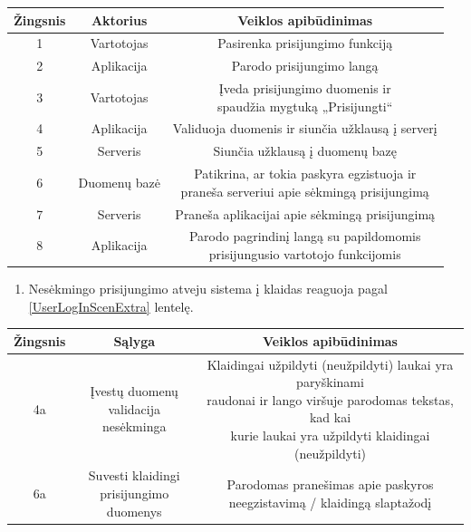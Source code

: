 \documentclass[12pt]{article}
\begin{document}
		\begin{center}
		\begin{tabular}{ | c | c | c | }
			\hline
			Žingsnis & Aktorius     & Veiklos apibūdinimas \\ \hline
			1        & Vartotojas   & Pasirenka prisijungimo funkciją \\ \hline
			2        & Aplikacija   & Parodo prisijungimo langą \\ \hline
			3        & Vartotojas   & \makecell{Įveda prisijungimo duomenis ir \\ spaudžia mygtuką „Prisijungti“} \\ \hline
			4        & Aplikacija   & Validuoja duomenis ir siunčia užklausą į serverį \\ \hline
			5        & Serveris     & Siunčia užklausą į duomenų bazę \\ \hline
			6        & Duomenų bazė & \makecell{Patikrina, ar tokia paskyra egzistuoja ir \\ praneša serveriui apie sėkmingą prisijungimą} \\ \hline
			7        & Serveris     & Praneša aplikacijai apie sėkmingą prisijungimą \\ \hline
			8        & Aplikacija   & \makecell{Parodo pagrindinį langą su papildomomis \\ prisijungusio vartotojo funkcijomis} \\ \hline
		\end{tabular}
		\bigskip
		\end{center}
		
	\begin{enumerate}[resume, labelindent=10pt,leftmargin=2.2cm]
		\item Nesėkmingo prisijungimo atveju sistema į klaidas reaguoja pagal \ref{UserLogInScenExtra} lentelę.
	\end{enumerate}		
		
		\begin{center}
		\begin{tabular}{ | c | c | c | }
			\hline
			Žingsnis & Sąlyga & Veiklos apibūdinimas \\ \hline
			4a       & \makecell{Įvestų duomenų \\ validacija nesėkminga} & \makecell{Klaidingai užpildyti (neužpildyti) laukai yra paryškinami \\ raudonai ir lango viršuje parodomas tekstas, kad kai \\ kurie laukai yra užpildyti klaidingai (neužpildyti)} \\ \hline
			6a       & \makecell{Suvesti klaidingi \\ prisijungimo duomenys} & \makecell{Parodomas pranešimas apie paskyros \\ neegzistavimą / klaidingą slaptažodį} \\ \hline
		\end{tabular}
		\end{center}
	\pagebreak
	
\end{document}
